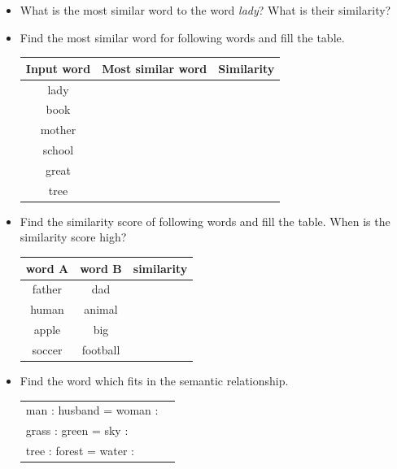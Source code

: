 \documentclass[12pt,fleqn]{article}
\begin{document}
\begin{enumerate}
\begin{itemize} 
 \item What is the most similar word to the word \textit{lady}? What is their similarity? 
 \item Find the most similar word for following words and fill the table. 
 \begin{table}[htb!] 
  \begin{center} 
     \begin{tabular}{c|c|c}
      Input word & Most similar word & Similarity \\  \hline 
      lady & & \\ 
      book & & \\ 
      mother & & \\ 
      school & & \\ 
      great & & \\ 
      tree & & \\ 
     \end{tabular}
  \end{center}
\end{table}
\item Find the similarity score of following words and fill the table. When is the similarity score high? 
\begin{table}[htb!] 
   \begin{center} 
         \begin{tabular}{c|c|c}
          word A & word B & similarity \\  \hline 
          father & dad &  \\ 
          human & animal &  \\ 
          apple & big & \\ 
          soccer & football & \\ 
         \end{tabular}
   \end{center}
\end{table}

\item Find the word which fits in the semantic relationship.

\begin{table}[htb!] 
   \begin{center} 
         \begin{tabular}{lc}
man : husband = woman :&  \\ 
grass : green = sky : & \\ 
tree : forest = water : & \\ 
         \end{tabular}
   \end{center}
\end{table}
\end{itemize}


\end{enumerate}
\end{document}
